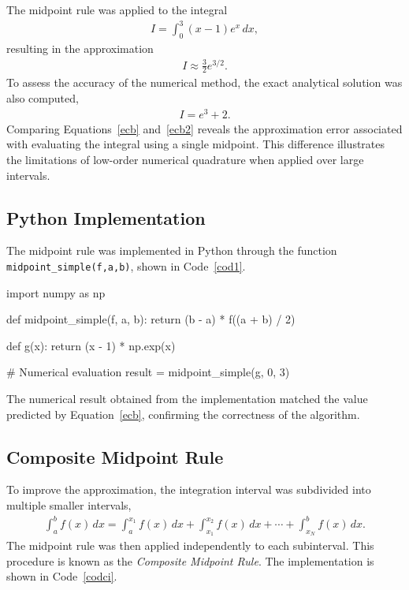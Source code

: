 \documentclass[../portafolio.tex]{subfiles}
\begin{document}
The midpoint rule was applied to the integral
\begin{align}
I = \int_{0}^{3} (x-1)e^x \, dx,
\label{ecpri}
\end{align}
resulting in the approximation
\begin{align}
I \approx \frac{3}{2}e^{3/2}.
\label{ecb}
\end{align}
To assess the accuracy of the numerical method, the exact analytical solution was also computed,
\begin{align}
I = e^3 + 2.
\label{ecb2}
\end{align}
Comparing Equations~\ref{ecb} and~\ref{ecb2} reveals the approximation error associated with evaluating the integral using a single midpoint. This difference illustrates the limitations of low-order numerical quadrature when applied over large intervals.

\subsection{Python Implementation}

The midpoint rule was implemented in Python through the function \texttt{midpoint\_simple(f,a,b)}, shown in Code~\ref{cod1}.

\begin{listing}
\begin{pythoncode}
import numpy as np

def midpoint_simple(f, a, b):
    return (b - a) * f((a + b) / 2)

def g(x):
    return (x - 1) * np.exp(x)

# Numerical evaluation
result = midpoint_simple(g, 0, 3)
\end{pythoncode}
\caption{Implementation of the Midpoint Rule.}
\label{cod1}
\end{listing}

The numerical result obtained from the implementation matched the value predicted by Equation~\ref{ecb}, confirming the correctness of the algorithm.

\subsection{Composite Midpoint Rule}

To improve the approximation, the integration interval was subdivided into multiple smaller intervals,
\begin{align*}
\int_a^b f(x)\,dx = \int_a^{x_1}f(x)\,dx + \int_{x_1}^{x_2}f(x)\,dx + \cdots + \int_{x_N}^{b}f(x)\,dx.
\end{align*}
The midpoint rule was then applied independently to each subinterval. This procedure is known as the \textit{Composite Midpoint Rule}. The implementation is shown in Code~\ref{codci}.
\end{document}
